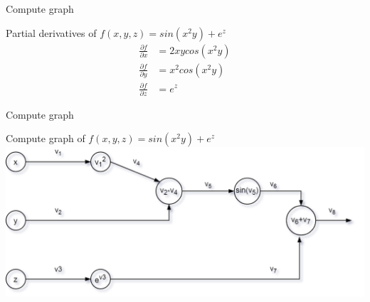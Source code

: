 
\begin{frame}{Compute graph}
	\begin{block}{ Partial derivatives of $f(x,y,z)= sin(x^2y)+e^z$}
		\begin{align}
			\frac{\partial f}{\partial x} &= 2xycos(x^2y) \\
			\frac{\partial f}{\partial y} &= x^2cos(x^2y) \\
			\frac{\partial f}{\partial z} &= e^z 
		\end{align}
	\end{block}
\end{frame} 

\begin{frame}{Compute graph}
	\begin{block}{ Compute graph of $f(x,y,z)= sin(x^2y)+e^z$}
		\includegraphics[width=1.\textwidth, center]{figuras/backprop_eg1.png}
	\end{block}
\end{frame}

